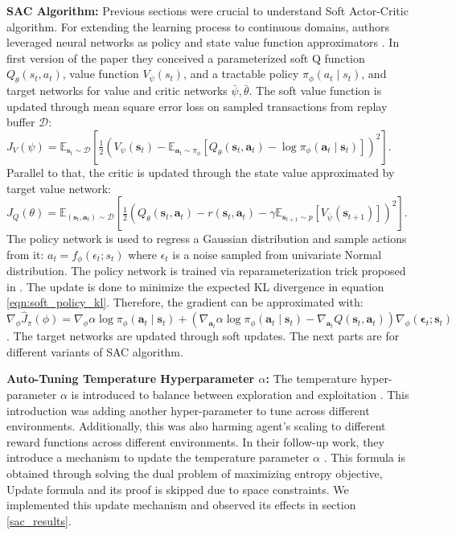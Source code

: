 \textbf{SAC Algorithm:} Previous sections were crucial to understand Soft Actor-Critic algorithm. For extending the learning process to continuous domains, authors leveraged neural networks as policy and state value function approximators \cite{HaarnojaAbbeelLevine2018:SAC}. In first version of the paper \cite{HaarnojaAbbeelLevine2018:SAC} they conceived a parameterized soft Q function $Q_{\theta}(s_t,a_t)$, value function $V_\psi(s_t)$, and a tractable policy $\pi_{\phi}(a_t \mid s_t)$, and target networks for value and critic networks $\bar{\psi}, \bar{\theta}$. The soft value function is updated through mean square error loss on sampled transactions from replay buffer $\mathcal{D}$: $J_V(\psi)=\mathbb{E}_{\mathbf{s}_t \sim \mathcal{D}}\left[\frac{1}{2}\left(V_\psi\left(\mathbf{s}_t\right)-\mathbb{E}_{\mathbf{a}_t \sim \pi_\phi}\left[Q_\theta\left(\mathbf{s}_t, \mathbf{a}_t\right)-\log \pi_\phi\left(\mathbf{a}_t \mid \mathbf{s}_t\right)\right]\right)^2\right].$ 
Parallel to that, the critic is updated through the state value approximated by target value network: $J_Q(\theta)=\mathbb{E}_{\left(\mathbf{s}_t, \mathbf{a}_t\right) \sim \mathcal{D}}\left[\frac{1}{2}\left(Q_\theta\left(\mathbf{s}_t, \mathbf{a}_t\right)- 
    r\left(\mathbf{s}_t, \mathbf{a}_t\right)-\gamma \mathbb{E}_{\mathbf{s}_{t+1} \sim p}\left[V_{\bar{\psi}}\left(\mathbf{s}_{t+1}\right)\right]
    \right)^2\right].$ \label{critic_update:sac} The policy network is used to regress a Gaussian distribution and sample actions from it: $a_{t}=f_{\phi}(\epsilon_t; s_t)$ where $\epsilon_{t}$ is a noise sampled from univariate Normal distribution. The policy network is trained via reparameterization trick proposed in \cite{kingma2022autoencoding}. The update is done to minimize the expected KL divergence in equation \ref{eqn:soft_policy_kl}. Therefore, the gradient can be approximated with: $\nabla_\phi \hat{J}_\pi(\phi)=\nabla_\phi \alpha \log \pi_\phi\left(\mathbf{a}_t \mid \mathbf{s}_t\right)+\left(\nabla_{\mathbf{a}_t} \alpha \log \pi_\phi\left(\mathbf{a}_t \mid \mathbf{s}_t\right)-\nabla_{\mathbf{a}_t} Q\left(\mathbf{s}_t, \mathbf{a}_t\right)\right) \nabla_\phi\left(\boldsymbol{\epsilon}_t ; \mathbf{s}_t\right)$. The target networks are updated through soft updates. The next parts are for different variants of SAC algorithm.

\textbf{Auto-Tuning Temperature Hyperparameter $\alpha$:} The temperature hyper-parameter $\alpha$ is introduced to balance between exploration and exploitation \cite{HaarnojaAbbeelLevine2018:SAC}. This introduction was adding another hyper-parameter to tune across different environments. Additionally, this was also harming agent's scaling to different reward functions across different environments. In their follow-up work, they introduce a mechanism to update the temperature parameter $\alpha$ \cite{haarnoja2019soft}. This formula is obtained through solving the dual problem of maximizing entropy objective, 
Update formula and its proof is skipped due to space constraints. We implemented this update mechanism and observed its effects in section \ref{sac_results}.


